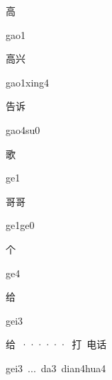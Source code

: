 \begin{multicols*}{2}
\begin{verbete}[gao1]{高}
\begin{pronuncia}{gao1}
\end{pronuncia}
\end{verbete}

\begin{verbete}{高兴}
\begin{pronuncia}{gao1xing4}
\end{pronuncia}
\end{verbete}

\begin{verbete}[gao4su0]{告诉}
\begin{pronuncia}{gao4su0}
\end{pronuncia}
\end{verbete}

\begin{verbete}[ge1]{歌}
\begin{pronuncia}{ge1}
\end{pronuncia}
\end{verbete}

\begin{verbete}[ge1ge0]{哥哥}
\begin{pronuncia}{ge1ge0}
\end{pronuncia}
\end{verbete}

\begin{verbete}[ge4]{个}
\begin{pronuncia}{ge4}
\end{pronuncia}
\end{verbete}

\begin{verbete}[gei3]{给}
\begin{pronuncia}{gei3}
\end{pronuncia}
\end{verbete}

\begin{verbete}{给\ ······\ 打\ 电话}
\begin{pronuncia}[\\]{gei3\ ...\ da3\ dian4hua4}
\end{pronuncia}
\end{verbete}


\end{multicols*}
